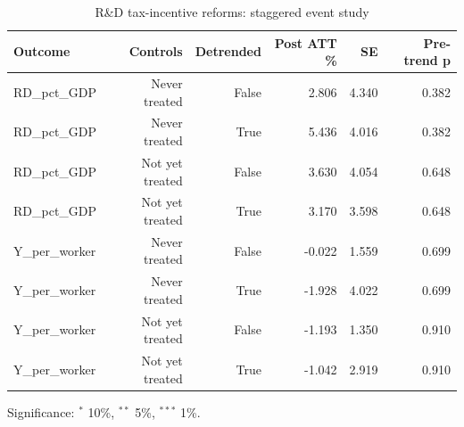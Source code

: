 \begin{table}[htbp]
\centering\small
\caption{R\&D tax-incentive reforms: staggered event study}
\label{tab:taxes}
\begin{tabular}{lrrrrr}
\toprule
Outcome & Controls & Detrended & Post ATT \% & SE & Pre-trend p \\
\midrule
RD\_pct\_GDP & Never treated & False & 2.806 & 4.340 & 0.382 \\
RD\_pct\_GDP & Never treated & True & 5.436 & 4.016 & 0.382 \\
RD\_pct\_GDP & Not yet treated & False & 3.630 & 4.054 & 0.648 \\
RD\_pct\_GDP & Not yet treated & True & 3.170 & 3.598 & 0.648 \\
Y\_per\_worker & Never treated & False & -0.022 & 1.559 & 0.699 \\
Y\_per\_worker & Never treated & True & -1.928 & 4.022 & 0.699 \\
Y\_per\_worker & Not yet treated & False & -1.193 & 1.350 & 0.910 \\
Y\_per\_worker & Not yet treated & True & -1.042 & 2.919 & 0.910 \\
\bottomrule
\end{tabular}
\par\footnotesize Significance: $^{*}$ 10\%, $^{**}$ 5\%, $^{***}$ 1\%.
\end{table}
